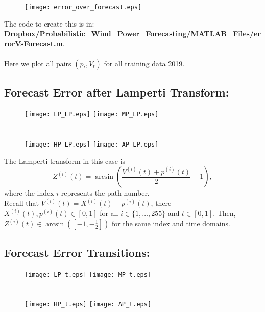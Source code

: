 \documentclass[12pt]{article}
\theoremstyle{definition}
\theoremstyle{remark}
\begin{document}
\begin{figure}[ht!]
\centering
{\texttt{[image: error\_over\_forecast.eps]}}
\end{figure}

The code to create this is in:\\
\textbf{Dropbox/Probabilistic\_Wind\_Power\_Forecasting/MATLAB\_Files/errorVsForecast.m}.\\
\quad\\
Here we plot all pairs $(p_t,V_t)$ for all training data 2019.
\pagebreak 

\subsection*{Forecast Error after Lamperti Transform:}

\begin{figure}[ht!]
\centering
{\texttt{[image: LP\_LP.eps]}}\quad
{\texttt{[image: MP\_LP.eps]}}\\
\quad\\
\quad\\
{\texttt{[image: HP\_LP.eps]}}\quad
{\texttt{[image: AP\_LP.eps]}}
\end{figure}

The Lamperti transform in this case is
\begin{equation*}
Z^{(i)}(t)=\arcsin\left(\frac{V^{(i)}(t)+p^{(i)}(t)}{2}-1\right),
\end{equation*}
where the index $i$ represents the path number.\\
Recall that $V^{(i)}(t)=X^{(i)}(t)-p^{(i)}(t)$, there $X^{(i)}(t),p^{(i)}(t)\in[0,1]$ for all $i\in\{1,\dots,255\}$ and $t\in[0,1]$. Then, $Z^{(i)}(t)\in\arcsin\left([-1,-\frac{1}{2}]\right)$ for the same index and time domains.

\pagebreak 

\subsection*{Forecast Error Transitions:}

\begin{figure}[ht!]
\centering
{\texttt{[image: LP\_t.eps]}}\quad
{\texttt{[image: MP\_t.eps]}}\\
\quad\\
\quad\\
{\texttt{[image: HP\_t.eps]}}\quad
{\texttt{[image: AP\_t.eps]}}
\end{figure}
\end{document}

